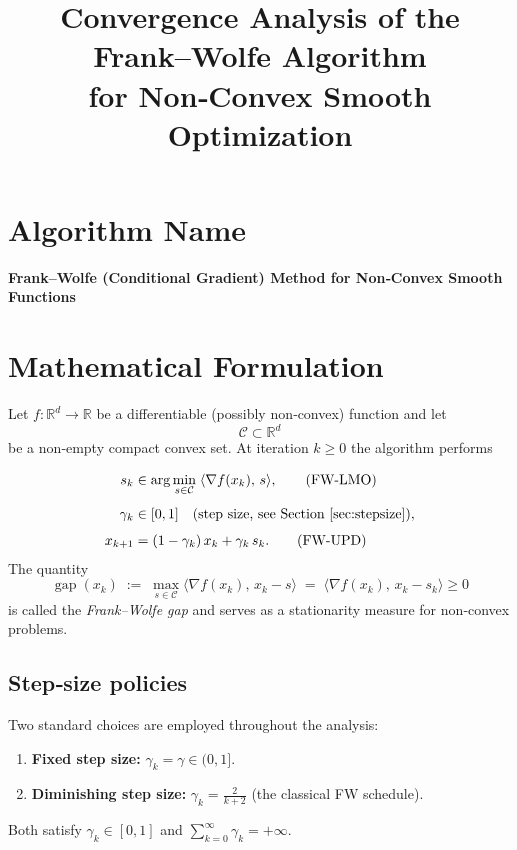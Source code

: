 \documentclass{article}
\newcommand{\gap}{\operatorname{gap}}
\begin{document}
\title{Convergence Analysis of the Frank–Wolfe Algorithm\\ for Non‑Convex Smooth Optimization}
\author{}
\date{}
\maketitle

\tableofcontents
\newpage

\section*{Algorithm Name}
\begin{center}
\textbf{Frank–Wolfe (Conditional Gradient) Method for Non‑Convex Smooth Functions}
\end{center}

\section{Mathematical Formulation}
\label{sec:formulation}
Let $f:\mathbb{R}^{d}\rightarrow\mathbb{R}$ be a differentiable (possibly non‑convex) function and let
\[
\mathcal C\subset\mathbb{R}^{d}
\]
be a non‑empty compact convex set.  
At iteration $k\ge 0$ the algorithm performs

\begin{align}
s_{k}&\in\arg\min_{s\in\mathcal C}\;\langle \nabla f(x_{k}),\,s\rangle, \tag{FW‑LMO}\\[4pt]
\gamma_{k}&\in[0,1]\quad\text{(step size, see Section \ref{sec:stepsize})},\\[4pt]
x_{k+1}&=(1-\gamma_{k})\,x_{k}+\gamma_{k}\,s_{k}. \tag{FW‑UPD}
\end{align}
The quantity
\[
\gap(x_{k})\;:=\;\max_{s\in\mathcal C}\langle \nabla f(x_{k}),\,x_{k}-s\rangle
               \;=\;\langle \nabla f(x_{k}),\,x_{k}-s_{k}\rangle\ge 0
\]
is called the \emph{Frank–Wolfe gap} and serves as a stationarity measure for non‑convex problems.

\subsection{Step‑size policies}
\label{sec:stepsize}
Two standard choices are employed throughout the analysis:
\begin{enumerate}[label=(\alph*)]
\item \textbf{Fixed step size:} $\displaystyle\gamma_{k}=\gamma\in(0,1]$.
\item \textbf{Diminishing step size:} $\displaystyle\gamma_{k}=\frac{2}{k+2}$ (the classical FW schedule).
\end{enumerate}
Both satisfy $\gamma_{k}\in[0,1]$ and $\sum_{k=0}^{\infty}\gamma_{k}=+\infty$.
\end{document}
